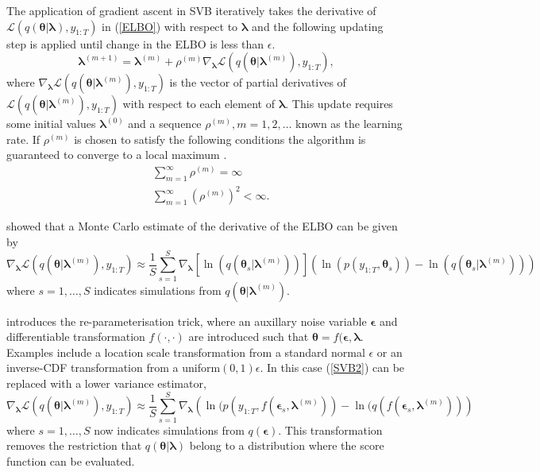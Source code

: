 \documentclass[12pt,a4paper]{article}%
\numberwithin{equation}{section}
\begin{document}
The application of gradient ascent in SVB iteratively takes the derivative of $\mathcal{L}(q(\boldsymbol{\theta} | \boldsymbol{\lambda}), y_{1:T})$ in (\ref{ELBO}) with respect to $\boldsymbol{\lambda}$ and the following updating step is applied until change in the ELBO is less than $\epsilon$.
\begin{equation}
\label{SVB1}
\boldsymbol{\lambda}^{(m+1)} = \boldsymbol{\lambda}^{(m)} + \rho^{(m)} \nabla_{\boldsymbol{\lambda}} \mathcal{L}(q(\boldsymbol{\theta} | \boldsymbol{\lambda}^{(m)}), y_{1:T}),
\end{equation}
where $\nabla_{\boldsymbol{\lambda}}\mathcal{L}(q(\boldsymbol{\theta} | \boldsymbol{\lambda}^{(m)}), y_{1:T})$ is the vector of partial derivatives of $\mathcal{L}(q(\boldsymbol{\theta} | \boldsymbol{\lambda}^{(m)}), y_{1:T})$ with respect to each element of $\boldsymbol{\lambda}$. This update requires some initial values $\boldsymbol{\lambda}^{(0)}$ and a sequence $\rho^{(m)}, m = 1, 2, \dots$ known as the learning rate. If $\rho^{(m)}$ is chosen to satisfy the following conditions the algorithm is guaranteed to converge to a local maximum \citep{Robbins1951}.
\begin{align}
&\sum_{m=1}^{\infty} \rho^{(m)} =  \infty \\
&\sum_{m=1}^{\infty} (\rho^{(m)})^2 <  \infty.
\end{align}

\citet{Ranganath2014} showed that a Monte Carlo estimate of the derivative of the ELBO can be given by
\begin{equation}
\label{SVB2}
\nabla_{\boldsymbol{\lambda}}\mathcal{L}(q(\boldsymbol{\theta} | \boldsymbol{\lambda}^{(m)}), y_{1:T}) \approx \frac{1}{S}\sum_{s=1}^{S} \nabla_{\boldsymbol{\lambda}} [\ln(q(\boldsymbol{\theta}_s | \boldsymbol{\lambda}^{(m)}))] (\ln (p(y_{1:T}, \boldsymbol{\theta}_s)) - \ln(q(\boldsymbol{\theta}_s | \boldsymbol{\lambda}^{(m)})))
\end{equation}
where $s = 1, \dots, S$ indicates simulations from $q(\boldsymbol{\theta} | \boldsymbol{\lambda}^{(m)})$.

\citet{Kingma2014} introduces the re-parameterisation trick, where an auxillary noise variable $\boldsymbol{\epsilon}$ and differentiable transformation $f(\cdot, \cdot)$ are introduced such that $\boldsymbol{\theta} = f(\boldsymbol{\epsilon}, \boldsymbol{\lambda}$. Examples include a location scale transformation from a standard normal $\epsilon$ or an inverse-CDF transformation from a uniform$(0, 1) \epsilon$. In this case (\ref{SVB2}) can be replaced with a lower variance estimator,
\begin{equation}
\label{reparameterise}
\nabla_{\boldsymbol{\lambda}}\mathcal{L}(q(\boldsymbol{\theta} | \boldsymbol{\lambda}^{(m)}), y_{1:T}) \approx \frac{1}{S}\sum_{s=1}^{S} \nabla_{\boldsymbol{\lambda}} \left( \ln (p(y_{1:T}, f(\boldsymbol{\epsilon}_s, \boldsymbol{\lambda}^{(m)})) - \ln(q(f(\boldsymbol{\epsilon}_s, \boldsymbol{\lambda}^{(m)})) \right)
\end{equation}
where $s = 1, \dots, S$ now indicates simulations from $q(\boldsymbol{\epsilon})$. This transformation removes the restriction that $q(\boldsymbol{\theta} | \boldsymbol{\lambda})$ belong to a distribution where the score function can be evaluated.
\end{document}
